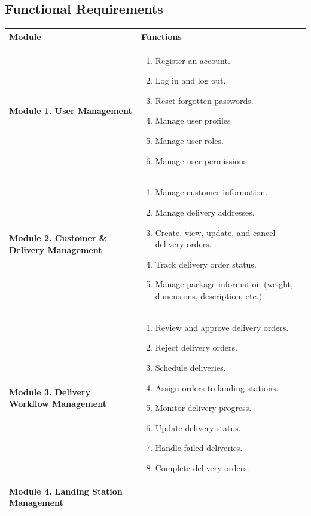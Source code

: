 \subsection{Functional Requirements}

\begin{longtable}{@{}p{4cm}p{9cm}@{}}
\toprule
\textbf{Module} & \textbf{Functions} \\
\midrule
\endhead
\textbf{Module 1. User Management} &
\begin{enumerate}
  \item Register an account.
  \item Log in and log out.
  \item Reset forgotten passwords.
  \item Manage user profiles
  \item Manage user roles.
  \item Manage user permissions.
\end{enumerate} \\
\addlinespace
\textbf{Module 2. Customer \& Delivery Management} &
\begin{enumerate}
  \item Manage customer information.
  \item Manage delivery addresses.
  \item Create, view, update, and cancel delivery orders.
  \item Track delivery order status.
  \item Manage package information (weight, dimensions, description, etc.).
\end{enumerate} \\
\addlinespace
\textbf{Module 3. Delivery Workflow Management} &
\begin{enumerate}
  \item Review and approve delivery orders.
  \item Reject delivery orders.
  \item Schedule deliveries.
  \item Assign orders to landing stations.
  \item Monitor delivery progress.
  \item Update delivery status.
  \item Handle failed deliveries.
  \item Complete delivery orders.
\end{enumerate} \\
\addlinespace
\textbf{Module 4. Landing Station Management} &
\begin{enumerate}

\end{enumerate}
\end{longtable}
